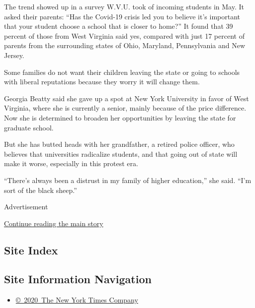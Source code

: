 The trend showed up in a survey W.V.U. took of incoming students in May.
It asked their parents: ``Has the Covid-19 crisis led you to believe
it's important that your student choose a school that is closer to
home?'' It found that 39 percent of those from West Virginia said yes,
compared with just 17 percent of parents from the surrounding states of
Ohio, Maryland, Pennsylvania and New Jersey.

Some families do not want their children leaving the state or going to
schools with liberal reputations because they worry it will change them.

Georgia Beatty said she gave up a spot at New York University in favor
of West Virginia, where she is currently a senior, mainly because of the
price difference. Now she is determined to broaden her opportunities by
leaving the state for graduate school.

But she has butted heads with her grandfather, a retired police officer,
who believes that universities radicalize students, and that going out
of state will make it worse, especially in this protest era.

``There's always been a distrust in my family of higher education,'' she
said. ``I'm sort of the black sheep.''

Advertisement

\protect\hyperlink{after-bottom}{Continue reading the main story}

\hypertarget{site-index}{%
\subsection{Site Index}\label{site-index}}

\hypertarget{site-information-navigation}{%
\subsection{Site Information
Navigation}\label{site-information-navigation}}

\begin{itemize}
\tightlist
\item
  \href{https://help.nytimes.com/hc/en-us/articles/115014792127-Copyright-notice}{©~2020~The
  New York Times Company}
\end{itemize}

